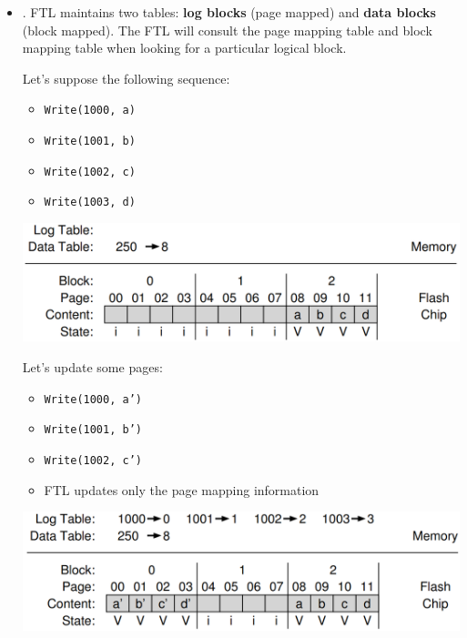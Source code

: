 \begin{itemize}
    \item {}. FTL maintains two tables: \textbf{log blocks} (page mapped) and \textbf{data blocks} (block mapped). The FTL will consult the page mapping table and block mapping table when looking for a particular logical block.
    \begin{examplebox}
        Let's suppose the following sequence:
        \begin{multicols}{2}
            \begin{itemize}
                \item \texttt{Write(1000, a)}
                \item \texttt{Write(1001, b)}
                \item \texttt{Write(1002, c)}
                \item \texttt{Write(1003, d)}
            \end{itemize}
        \end{multicols}
        \begin{center}
            \includegraphics[width=\textwidth]{img/hybrid-mapping-1.png}
        \end{center}
        Let's update some pages:
        \begin{itemize}
            \item \texttt{Write(1000, a')}
            \item \texttt{Write(1001, b')}
            \item \texttt{Write(1002, c')}
            \item FTL updates only the page mapping information
        \end{itemize}
        \begin{center}
            \includegraphics[width=\textwidth]{img/hybrid-mapping-2.png}

\end{center}
\end{examplebox}
\end{itemize}
